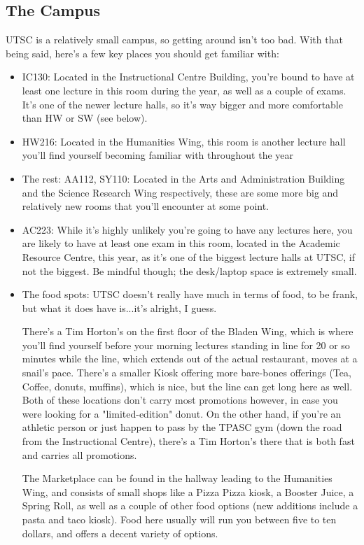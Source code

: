 \documentclass[11pt]{article}
\begin{document}
\subsection{The Campus}
UTSC is a relatively small campus, so getting around isn't too bad.  With that being said, here's a few key places you should get familiar with:
\begin{itemize}
\item IC130: Located in the Instructional Centre Building, you're bound to have at least one lecture in this room during the year, as well as a couple of exams. It's one of the newer lecture halls, so it's way bigger and more comfortable than HW or SW (see below).
\item HW216: Located in the Humanities Wing, this room is another lecture hall you'll find yourself becoming familiar with throughout the year
\item The rest: AA112, SY110: Located in the Arts and Administration Building and the Science Research Wing respectively, these are some more big and relatively new rooms that you'll encounter at some point.
\item AC223: While it's highly unlikely you're going to have any lectures here, you are likely to have at least one exam in this room, located in the Academic Resource Centre, this year, as it's one of the biggest lecture halls at UTSC, if not the biggest. Be mindful though; the desk/laptop space is extremely small.
\item The food spots: UTSC doesn't really have much in terms of food, to be frank, but what it does have is...it's alright, I guess.\par 
There's a Tim Horton's on the first floor of the Bladen Wing, which is where you'll find yourself before your morning lectures standing in line for 20 or so minutes while the line, which extends out of the actual restaurant, moves at a snail's pace.  There's a smaller Kiosk offering more bare-bones offerings (Tea, Coffee, donuts, muffins), which is nice, but the line can get long here as well. Both of these locations don't carry most promotions however, in case you were looking for a "limited-edition" donut. On the other hand, if you're an athletic person or just happen to pass by the TPASC gym (down the road from the Instructional Centre), there's a Tim Horton's there that is both fast and carries all promotions. \par
The Marketplace can be found in the hallway leading to the Humanities Wing, and consists of small shops like a Pizza Pizza kiosk, a Booster Juice, a Spring Roll, as well as a couple of other food options (new additions include a pasta and taco kiosk).  Food here usually will run you between five to ten dollars, and offers a decent variety of options.\par

\end{itemize}
\end{document}

